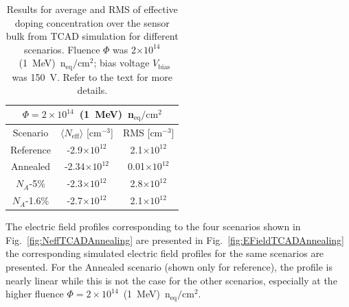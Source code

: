 \begin{table}[htbp]
   \centering
   \begin{tabular}{|c|c|c|} %
      \hline
            \multicolumn{3}{|c|}{$\Phi=2\times10^{14}$~(1~MeV)~n$_\text{eq}/\text{cm}^{2}$  } \\
      \hline %
        Scenario  & $\langle N_\text{eff}\rangle$ [cm$^{-3}$] & RMS [cm$^{-3}$] \\
      \hline
         Reference &  -2.9$\times10^{12}$ & 2.1$\times10^{12}$  \\
 Annealed   & -2.34$\times10^{12}$ & 0.01$\times10^{12}$ \\
 $N_A$-5\% &  -2.3$\times10^{12}$ & 2.8$\times10^{12}$  \\
 $N_A$-1.6\% &  -2.7$\times10^{12}$ & 2.1$\times10^{12}$  \\
                   \bottomrule
   \end{tabular}
   \caption{\label{tab:TCADNeffHamburg2}Results for average and RMS of effective doping concentration over the sensor bulk from TCAD simulation for different scenarios. 
Fluence $\Phi$ was 2$\times10^{14}$~(1~MeV)~n$_\text{eq}/\text{cm}^{2}$; bias voltage $V_\text{bias}$ 
was 150~V.  Refer to the text for more details.}
\end{table}

The electric field profiles corresponding to the four scenarios shown in Fig.~\ref{fig:NeffTCADAnnealing} are presented in Fig.~\ref{fig:EFieldTCADAnnealing} the corresponding simulated electric field profiles for the 
same scenarios are presented.   For the Annealed scenario (shown only for reference), the profile is nearly linear while this is not the case for the other scenarios, especially at the higher fluence $\Phi=2\times10^{14}$~(1~MeV)~n$_\text{eq}/\text{cm}^{2}$.  


